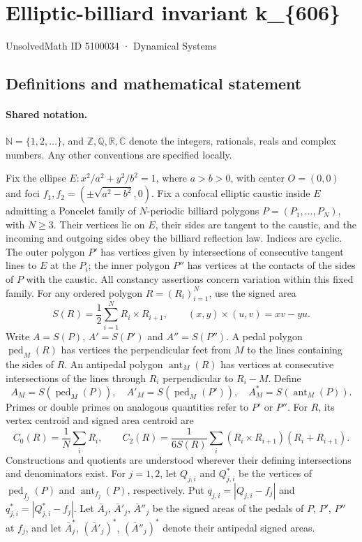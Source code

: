 \documentclass[11pt]{article}
\begin{document}
\setcounter{section}{5100033}
\section{Elliptic-billiard invariant k\_\{606\}}\label{5100034}
{\small\sffamily UnsolvedMath ID 5100034 · Dynamical Systems}
\subsection{Definitions and mathematical statement}

\paragraph{Shared notation.}$\mathbb N=\{1,2,\ldots\}$, and $\mathbb Z,\mathbb Q,\mathbb R,\mathbb C$ denote the integers, rationals, reals and complex numbers. Any other conventions are specified locally.


Fix the ellipse $E:x^2/a^2+y^2/b^2=1$, where $a>b>0$, with center $O=(0,0)$ and foci $f_1,f_2=(\pm\sqrt{a^2-b^2},0)$. Fix a confocal elliptic caustic inside $E$ admitting a Poncelet family of $N$-periodic billiard polygons $P=(P_1,\ldots,P_N)$, with $N\geq3$. Their vertices lie on $E$, their sides are tangent to the caustic, and the incoming and outgoing sides obey the billiard reflection law. Indices are cyclic. The outer polygon $P'$ has vertices given by intersections of consecutive tangent lines to $E$ at the $P_i$; the inner polygon $P''$ has vertices at the contacts of the sides of $P$ with the caustic. All constancy assertions concern variation within this fixed family.
For any ordered polygon $R=(R_i)_{i=1}^N$, use the signed area
\[S(R)=\frac12\sum_{i=1}^N R_i\times R_{i+1},\qquad (x,y)\times(u,v)=xv-yu.\]
Write $A=S(P)$, $A'=S(P')$ and $A''=S(P'')$. A pedal polygon $\operatorname{ped}_M(R)$ has vertices the perpendicular feet from $M$ to the lines containing the sides of $R$. An antipedal polygon $\operatorname{ant}_M(R)$ has vertices at consecutive intersections of the lines through $R_i$ perpendicular to $R_i-M$. Define
\[A_M=S(\operatorname{ped}_M(P)),\quad A'_M=S(\operatorname{ped}_M(P')),\quad A_M^*=S(\operatorname{ant}_M(P)).\]
Primes or double primes on analogous quantities refer to $P'$ or $P''$. For $R$, its vertex centroid and signed area centroid are
\[C_0(R)=\frac1N\sum_i R_i,\qquad C_2(R)=\frac{1}{6S(R)}\sum_i(R_i\times R_{i+1})(R_i+R_{i+1}).\]
Constructions and quotients are understood wherever their defining intersections and denominators exist.
For $j=1,2$, let $Q_{j,i}$ and $Q^*_{j,i}$ be the vertices of $\operatorname{ped}_{f_j}(P)$ and $\operatorname{ant}_{f_j}(P)$, respectively. Put $q_{j,i}=|Q_{j,i}-f_j|$ and $q^*_{j,i}=|Q^*_{j,i}-f_j|$. Let $\bar A_j$, $\bar A'_j$, $\bar A''_j$ be the signed areas of the pedals of $P$, $P'$, $P''$ at $f_j$, and let $\bar A_j^*$, $(\bar A'_j)^*$, $(\bar A''_j)^*$ denote their antipedal signed areas.
\end{document}
